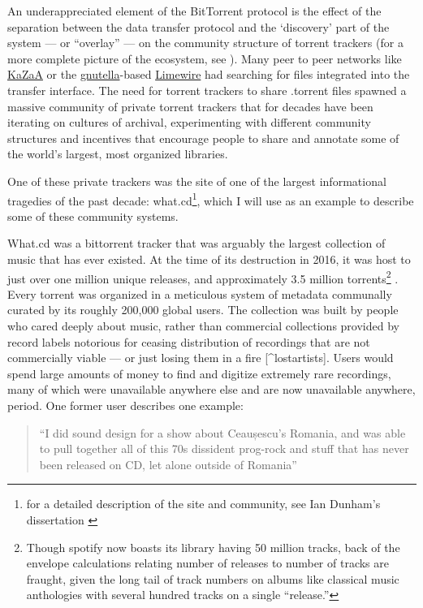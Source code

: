 \documentclass[10pt]{article}
\begin{document}
\begin{multicols}{2}
An underappreciated element of the BitTorrent protocol is the effect of
the separation between the data transfer protocol and the `discovery'
part of the system --- or ``overlay'' --- on the community structure of
torrent trackers (for a more complete picture of the ecosystem, see \cite{zhangUnravelingBitTorrentEcosystem2011} ). Many peer to peer
networks like \href{https://en.wikipedia.org/wiki/Kazaa}{KaZaA} or the
\href{https://en.wikipedia.org/wiki/Gnutella}{gnutella}-based
\href{https://en.wikipedia.org/wiki/LimeWire}{Limewire} had searching
for files integrated into the transfer interface. The need for torrent
trackers to share .torrent files spawned a massive community of private
torrent trackers that for decades have been iterating on cultures of
archival, experimenting with different community structures and
incentives that encourage people to share and annotate some of the
world's largest, most organized libraries.

One of these private trackers was the site of one of the largest
informational tragedies of the past decade: what.cd\footnote{for a
  detailed description of the site and community, see Ian Dunham's
  dissertation \cite{dunhamWhatCDLegacy2018} }, which I will use
as an example to describe some of these community systems.

What.cd was a bittorrent tracker that was arguably the largest
collection of music that has ever existed. At the time of its
destruction in 2016, it was host to just over one million unique
releases, and approximately 3.5 million torrents\footnote{Though spotify
  now boasts its library having 50 million tracks, back of the envelope
  calculations relating number of releases to number of tracks are
  fraught, given the long tail of track numbers on albums like classical
  music anthologies with several hundred tracks on a single ``release.''}
\cite{dunhamWhatCDLegacy2018} . Every torrent was organized in a
meticulous system of metadata communally curated by its roughly 200,000
global users. The collection was built by people who cared deeply about
music, rather than commercial collections provided by record labels
notorious for ceasing distribution of recordings that are not
commercially viable --- or just losing them in a fire \cite{rosenDayMusicBurned2019} {[}\^{}lostartists{]}. Users would spend
large amounts of money to find and digitize extremely rare recordings,
many of which were unavailable anywhere else and are now unavailable
anywhere, period. One former user describes one example:

\begin{quote}
``I did sound design for a show about Ceaușescu's Romania, and was able
to pull together all of this 70s dissident prog-rock and stuff that has
never been released on CD, let alone outside of Romania'' \cite{sonnadEulogyWhatCd2016} 
\end{quote}


\end{multicols}
\end{document}
